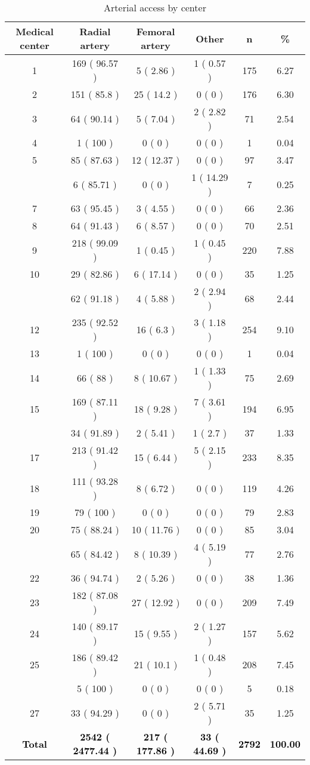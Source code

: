 \documentclass[
]{article}
\begin{document}
\begin{longtable}[t]{cccccc}
\caption{\label{tab:table 19}Arterial access by center}\\
\toprule
Medical center & Radial artery & Femoral artery & Other & n & \%\\
\midrule
1 & 169 ( 96.57 ) & 5 ( 2.86 ) & 1 ( 0.57 ) & 175 & 6.27\\
2 & 151 ( 85.8 ) & 25 ( 14.2 ) & 0 ( 0 ) & 176 & 6.30\\
3 & 64 ( 90.14 ) & 5 ( 7.04 ) & 2 ( 2.82 ) & 71 & 2.54\\
4 & 1 ( 100 ) & 0 ( 0 ) & 0 ( 0 ) & 1 & 0.04\\
5 & 85 ( 87.63 ) & 12 ( 12.37 ) & 0 ( 0 ) & 97 & 3.47\\
\addlinespace
6 & 6 ( 85.71 ) & 0 ( 0 ) & 1 ( 14.29 ) & 7 & 0.25\\
7 & 63 ( 95.45 ) & 3 ( 4.55 ) & 0 ( 0 ) & 66 & 2.36\\
8 & 64 ( 91.43 ) & 6 ( 8.57 ) & 0 ( 0 ) & 70 & 2.51\\
9 & 218 ( 99.09 ) & 1 ( 0.45 ) & 1 ( 0.45 ) & 220 & 7.88\\
10 & 29 ( 82.86 ) & 6 ( 17.14 ) & 0 ( 0 ) & 35 & 1.25\\
\addlinespace
11 & 62 ( 91.18 ) & 4 ( 5.88 ) & 2 ( 2.94 ) & 68 & 2.44\\
12 & 235 ( 92.52 ) & 16 ( 6.3 ) & 3 ( 1.18 ) & 254 & 9.10\\
13 & 1 ( 100 ) & 0 ( 0 ) & 0 ( 0 ) & 1 & 0.04\\
14 & 66 ( 88 ) & 8 ( 10.67 ) & 1 ( 1.33 ) & 75 & 2.69\\
15 & 169 ( 87.11 ) & 18 ( 9.28 ) & 7 ( 3.61 ) & 194 & 6.95\\
\addlinespace
16 & 34 ( 91.89 ) & 2 ( 5.41 ) & 1 ( 2.7 ) & 37 & 1.33\\
17 & 213 ( 91.42 ) & 15 ( 6.44 ) & 5 ( 2.15 ) & 233 & 8.35\\
18 & 111 ( 93.28 ) & 8 ( 6.72 ) & 0 ( 0 ) & 119 & 4.26\\
19 & 79 ( 100 ) & 0 ( 0 ) & 0 ( 0 ) & 79 & 2.83\\
20 & 75 ( 88.24 ) & 10 ( 11.76 ) & 0 ( 0 ) & 85 & 3.04\\
\addlinespace
21 & 65 ( 84.42 ) & 8 ( 10.39 ) & 4 ( 5.19 ) & 77 & 2.76\\
22 & 36 ( 94.74 ) & 2 ( 5.26 ) & 0 ( 0 ) & 38 & 1.36\\
23 & 182 ( 87.08 ) & 27 ( 12.92 ) & 0 ( 0 ) & 209 & 7.49\\
24 & 140 ( 89.17 ) & 15 ( 9.55 ) & 2 ( 1.27 ) & 157 & 5.62\\
25 & 186 ( 89.42 ) & 21 ( 10.1 ) & 1 ( 0.48 ) & 208 & 7.45\\
\addlinespace
26 & 5 ( 100 ) & 0 ( 0 ) & 0 ( 0 ) & 5 & 0.18\\
27 & 33 ( 94.29 ) & 0 ( 0 ) & 2 ( 5.71 ) & 35 & 1.25\\
\textcolor{black}{\textbf{Total}} & \textcolor{black}{\textbf{2542 ( 2477.44 )}} & \textcolor{black}{\textbf{217 ( 177.86 )}} & \textcolor{black}{\textbf{33 ( 44.69 )}} & \textcolor{black}{\textbf{2792}} & \textcolor{black}{\textbf{100.00}}\\
\bottomrule
\end{longtable}
\clearpage
\end{document}
